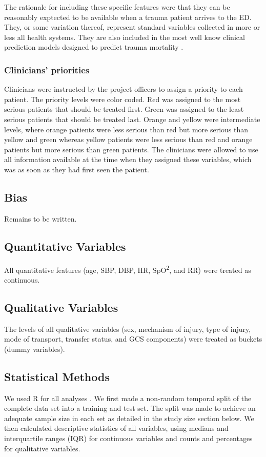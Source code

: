 \documentclass[10pt,letterpaper]{article}\usepackage[]{graphicx}\usepackage[]{color}
\begin{document}
The rationale for including these specific features were that they can be
reasonably exptected to be available when a trauma patient arrives to the
ED. They, or some variation thereof, represent standard variables collected in
more or less all health systems. They are also included in the most well know
clinical prediction models designed to predict trauma mortality \cite{Rehn2011}.

\subsubsection*{Clinicians' priorities}
Clinicians were instructed by the project officers to assign a priority to each
patient. The priority levels were color coded. Red was assigned to the most
serious patients that should be treated first. Green was assigned to the least
serious patients that should be treated last. Orange and yellow were
intermediate levels, where orange patients were less serious than red but more
serious than yellow and green whereas yellow patients were less serious than red
and orange patients but more serious than green patients. The clinicians were
allowed to use all information available at the time when they assigned these
variables, which was as soon as they had first seen the patient.

\subsection*{Bias}
Remains to be written.

\subsection*{Quantitative Variables}
All quantitative features (age, SBP, DBP, HR, SpO\textsuperscript{2}, and RR) were
treated as continuous.

\subsection*{Qualitative Variables}
The levels of all qualitative variables (sex, mechanism of injury, type of
injury, mode of transport, transfer status, and GCS components) were treated as
buckets (dummy variables).

\subsection*{Statistical Methods}
We used R for all analyses \cite{R}. We first made a non-random temporal split
of the complete data set into a training and test set. The split was made to
achieve an adequate sample size in each set as detailed in the study size
section below. We then calculated descriptive statistics of all variables, using
medians and interquartile ranges (IQR) for continuous variables and counts and
percentages for qualitative variables.
\end{document}
